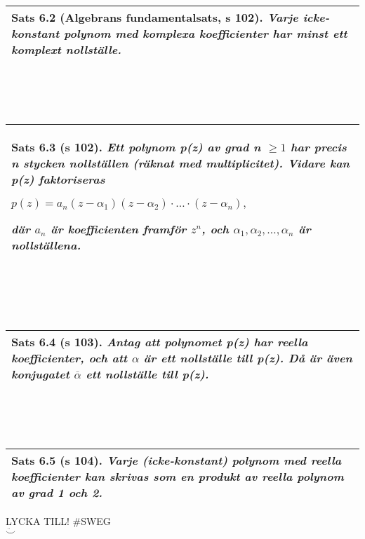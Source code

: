\documentclass[a4paper]{article}
\begin{document}
\\\\\\
\begin{tabular}{|L{11.5cm}|} \hline
\textbf{Sats 6.2} (Algebrans fundamentalsats, s 102).
\textit{Varje icke-konstant polynom med komplexa koefficienter har minst ett komplext nollställe.}
\\\hline
\end{tabular}
\\\\\\
\begin{tabular}{|L{11.5cm}|} \hline
\textbf{Sats 6.3} (s 102).
\textit{Ett polynom p(z) av grad n $\geq 1$ har precis n stycken nollställen (räknat med multiplicitet). Vidare kan p(z) faktoriseras}
\begin{center}
$p(z)=a_n(z-\alpha_1)(z-\alpha_2)\cdot\ldots\cdot(z-\alpha_n),$
\end{center}
\textit{där $a_n$ är koefficienten framför $z^n$, och $\alpha_1,\alpha_2,\ldots,\alpha_n$ är nollställena.}
\\\hline
\end{tabular}
\\\\\\
\begin{tabular}{|L{11.5cm}|} \hline
\textbf{Sats 6.4} (s 103).
\textit{Antag att polynomet p(z) har reella koefficienter, och att $\alpha$ är ett nollställe till p(z). Då är även konjugatet $\overline{\alpha}$ ett nollställe till p(z).}
\\\hline
\end{tabular}
\\\\\\
\begin{tabular}{|L{11.5cm}|} \hline
\textbf{Sats 6.5} (s 104).
\textit{Varje (icke-konstant) polynom med reella koefficienter kan skrivas som en produkt av reella polynom av grad 1 och 2.}
\\\hline
\end{tabular}
\begin{center}
\Huge LYCKA TILL! \#SWEG\\
\vspace{4pt}
\scriptsize $\ddot\smile$
\end{center}
\end{document}
